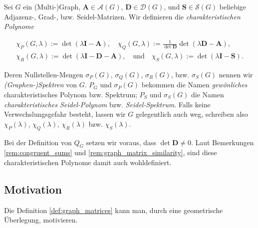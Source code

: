         \begin{definition} \label{def:graph_matrices}

            Sei $G$ ein (Multi-)Graph, $\mathbf A \in \mathcal A(G)$, $\mathbf D \in \mathcal D(G)$, und $\mathbf S \in \mathcal S(G)$ beliebige Adjazenz-, Grad-, bzw. Seidel-Matrizen.
            Wir definieren die \textit{charakteristischen Polynome}

            \begin{gather*}
                \chi_P(G, \lambda) := \det(\lambda \mathbf I - \mathbf A),
                \quad
                \chi_Q(G, \lambda) := \frac{1}{\det \mathbf D} \det(\lambda \mathbf D - \mathbf A), \\
                \chi_R(G, \lambda) := \det(\lambda \mathbf I - \mathbf D - \mathbf A),
                \quad
                \text{und}
                \quad
                \chi_S(G, \lambda) := \det(\lambda \mathbf I - \mathbf S).
            \end{gather*}

            Deren Nullstellen-Mengen $\sigma_P(G)$, $\sigma_Q(G)$, $\sigma_R(G)$, bzw. $\sigma_S(G)$ nennen wir \textit{(Graphen-)Spektren} von $G$.
            $P_G$ und $\sigma_P(G)$ bekommen die Namen \textit{gewönliches} charakteristisches Polynom bzw. Spektrum;
            $P_S$ und $\sigma_S(G)$ die Namen \textit{charakteristisches Seidel-Polynom} bzw. \textit{Seidel-Spektrum}.
            Falls keine Verwechslungsgefahr besteht, lassen wir $G$ gelegentlich auch weg, schreiben also $\chi_P(\lambda)$, $\chi_Q(\lambda)$, $\chi_R(\lambda)$ bzw. $\chi_S(\lambda)$.

            Bei der Definition von $Q_G$ setzen wir voraus, dass $\det \mathbf D \neq 0$.
            Laut Bemerkungen \ref{rem:congruent_sums} und \ref{rem:graph_matrix_similarity}, sind diese charakteristischen Polynome damit auch wohldefiniert. 

        \end{definition}


        \subsection{Motivation}

            Die Definition \ref{def:graph_matrices} kann man, durch eine geometrische Überlegung, motivieren.


